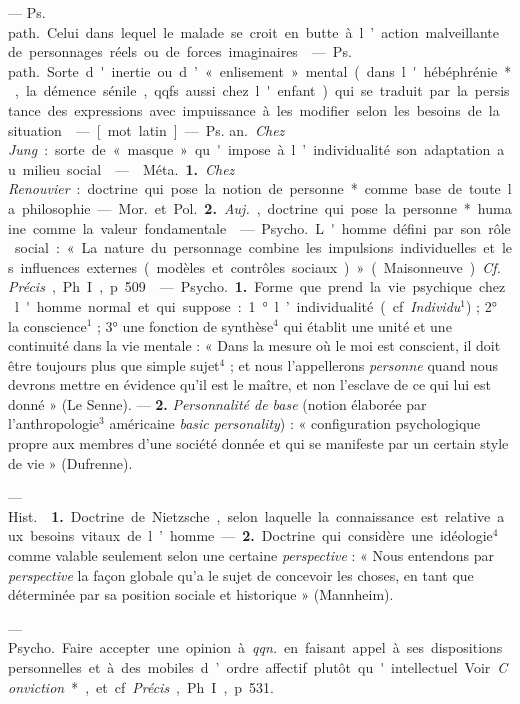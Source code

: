 \begin{itemize}[leftmargin=1cm, label=, itemsep=1pt]
 — \si{Ps. path.} Celui dans lequel le malade se
croit en butte à l’action malveillante de personnages réels ou de forces
imaginaires.

 — \si{Ps. path.} Sorte d'inertie ou d’ « enlisement » mental
(dans l'hébéphrénie*, la démence sénile, qqfs. aussi chez l'enfant) qui se
traduit par la persistance des expressions avec impuissance à les modifier
selon les besoins de la situation.

 — [mot latin] — \si{Ps. an.} {\it Chez Jung} : sorte de « masque
» qu'impose à l’individualité son adaptation au milieu social.

 —  \si{Méta.} {\bf 1.} {\it Chez
Renouvier} : doctrine qui pose la notion de personne* comme base de toute la
philosophie. — \si{Mor.} et \si{Pol.}  {\bf 2.} {\it Auj.}, doctrine qui pose
la personne* humaine comme la valeur fondamentale.

 — \si{Psycho.} L'homme défini par son rôle social : « La
nature du personnage combine les impulsions individuelles et les influences
externes (modèles et contrôles sociaux) » (Maisonneuve). {\it Cf.}
{\it Précis}, Ph. I, p. 509.

 — \si{Psycho.} {\bf 1.} Forme que prend la vie
psychique chez l'homme normal et qui suppose : 1° l’individualité (cf.
{\it Individu}$^1$) ; 2° la conscience$^1$ ; 3° une fonction de synthèse$^4$
qui établit une unité et une continuité dans la vie mentale : « Dans la
mesure où le moi est conscient, il doit être toujours plus que simple
sujet$^4$ ; et nous l’appellerons {\it personne} quand nous devrons mettre en
évidence qu'il est le maître, et non l’esclave de ce qui lui est donné » (Le
Senne). — {\bf 2.} {\it Personnalité
de base} (notion élaborée par l'anthropologie$^3$ américaine {\it basic
personality}) : « configuration psychologique propre aux membres d’une
société donnée et qui se manifeste par un certain style de vie » (Dufrenne).

 — \si{Hist.}  {\bf 1.} Doctrine de
Nietzsche, selon laquelle la connaissance est relative aux besoins vitaux de
l’homme. — {\bf 2.} Doctrine qui considère une idéologie$^4$ comme valable
seulement selon une certaine {\it perspective} : « Nous entendons par
{\it perspective} la façon globale qu’a le sujet de concevoir les choses, en
tant que déterminée par sa position sociale et historique » (Mannheim).

 — \si{Psycho.} Faire accepter une opinion à {\it qqn.} en
faisant appel à ses dispositions personnelles et à des mobiles d’ordre
affectif plutôt qu'intellectuel. Voir {\it Conviction}*, et cf. {\it Précis},
Ph. I, p. 531.


\end{itemize}
